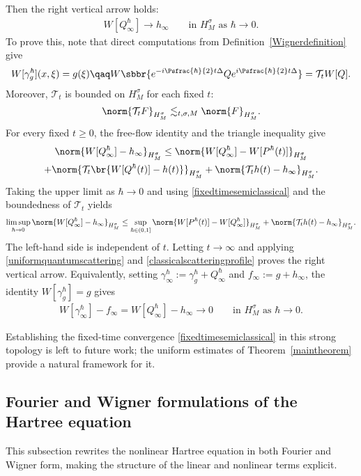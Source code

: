 Then the right vertical arrow holds:
\begin{align*}
W[Q^{\hbar}_{\infty}]\to h_\infty\qquad\text{in $H^{\sigma}_M$ as $\hbar\to0$.}
\end{align*}
To prove this, note that direct computations from Definition~\ref{Wignerdefinition} give
\begin{align*}
W[\gamma_g^{\hbar}](x,\xi)=g(\xi)\qaq W\sbbr{e^{-i\Psfrac{\hbar}{2}t\Delta}Qe^{i\Psfrac{\hbar}{2}t\Delta}}=\mathcal T_tW[Q].
\end{align*}
Moreover, $\mathcal T_t$ is bounded on $H^{\sigma}_M$ for each fixed $t$:
\begin{align*}
\norm{\mathcal T_tF}_{H^{\sigma}_M}\lesssim_{t,\sigma,M}\norm{F}_{H^{\sigma}_M}.
\end{align*}
For every fixed $t\geq0$, the free-flow identity and the triangle inequality give
\begin{multline*}
\norm{W[Q^{\hbar}_{\infty}]-h_\infty}_{H^{\sigma}_M}
\leq\norm{W[Q^{\hbar}_{\infty}]-W[P^{\hbar}(t)]}_{H^{\sigma}_M}\\
+\norm{\mathcal T_t\br{W[Q^{\hbar}(t)]-h(t)}}_{H^{\sigma}_M}+\norm{\mathcal T_th(t)-h_\infty}_{H^{\sigma}_M}.
\end{multline*}
Taking the upper limit as $\hbar\to0$ and using \eqref{fixedtimesemiclassical} and the boundedness of $\mathcal T_t$ yields
\begin{align*}
\limsup_{\hbar\to0}\norm{W[Q^{\hbar}_{\infty}]-h_\infty}_{H^{\sigma}_M}\leq\sup_{\hbar\in(0,1]}\norm{W[P^{\hbar}(t)]-W[Q^{\hbar}_{\infty}]}_{H^{\sigma}_M}+\norm{\mathcal T_th(t)-h_\infty}_{H^{\sigma}_M}.
\end{align*}
The left-hand side is independent of $t$. Letting $t\to\infty$ and applying \eqref{uniformquantumscattering} and \eqref{classicalscatteringprofile} proves the right vertical arrow. Equivalently, setting $\gamma^{\hbar}_{\infty}:=\gamma_g^{\hbar}+Q^{\hbar}_{\infty}$ and $f_\infty:=g+h_\infty$, the identity $W[\gamma_g^{\hbar}]=g$ gives
\begin{align*}
W[\gamma^{\hbar}_{\infty}]-f_\infty=W[Q^{\hbar}_{\infty}]-h_\infty\to0\qquad\text{in $H^{\sigma}_M$ as $\hbar\to0$.}
\end{align*}

Establishing the fixed-time convergence \eqref{fixedtimesemiclassical} in this strong topology is left to future work; the uniform estimates of Theorem~\ref{maintheorem} provide a natural framework for it.

\subsection{Fourier and Wigner formulations of the Hartree equation}This subsection rewrites the nonlinear Hartree equation in both Fourier and Wigner form, making the structure of the linear and nonlinear terms explicit.
